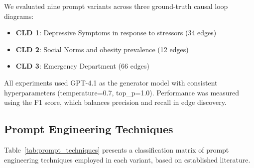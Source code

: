 We evaluated nine prompt variants across three ground-truth causal loop diagrams:
\begin{itemize}[noitemsep]
    \item \textbf{CLD 1}: Depressive Symptoms in response to stressors (34 edges)
    \item \textbf{CLD 2}: Social Norms and obesity prevalence (12 edges)
    \item \textbf{CLD 3}: Emergency Department (66 edges)
\end{itemize}

All experiments used GPT-4.1 as the generator model with consistent hyperparameters (temperature=0.7, top\_p=1.0). Performance was measured using the F1 score, which balances precision and recall in edge discovery.

\subsection{Prompt Engineering Techniques}

Table~\ref{tab:prompt_techniques} presents a classification matrix of prompt engineering techniques employed in each variant, based on established literature.


